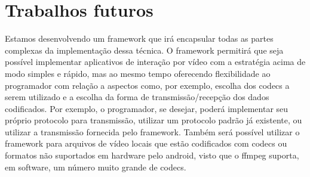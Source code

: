 \documentclass{acm_proc_article-sp}
\begin{document}
\section{Trabalhos futuros}

Estamos desenvolvendo um framework que irá encapsular todas as partes complexas da implementação dessa técnica. O framework permitirá que seja possível implementar aplicativos de interação por vídeo com a estratégia acima de modo simples e rápido, mas ao mesmo tempo oferecendo flexibilidade ao programador com relação a aspectos como, por exemplo, escolha dos codecs a serem utilizado e a escolha da forma de transmissão/recepção dos dados codificados. Por exemplo, o programador, se desejar, poderá implementar seu próprio protocolo para transmissão, utilizar um protocolo padrão já existente, ou utilizar a transmissão fornecida pelo framework. Também será possível utilizar o framework para arquivos de vídeo locais que estão codificados com codecs ou formatos não suportados em hardware pelo android, visto que o ffmpeg suporta, em software, um número muito grande de codecs.

%

%
%
\balancecolumns
\end{document}
